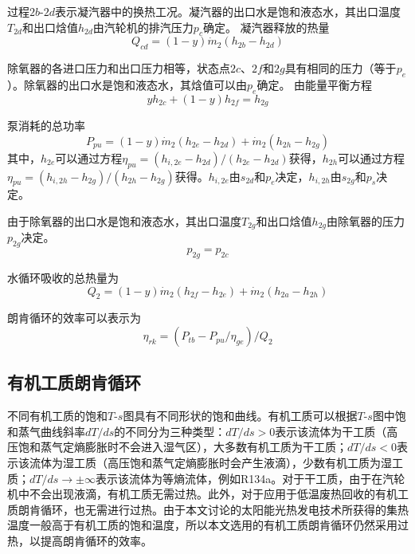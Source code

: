   过程$2b$-$2d$表示凝汽器中的换热工况。凝汽器的出口水是饱和液态水，其出口温度$T_{2d}$和出口焓值$h_{2d}$由汽轮机的排汽压力$p_c$确定。
  凝汽器释放的热量
  \begin{equation}
      Q_{cd} = (1-y)\dot{m}_2 (h_{2b} - h_{2d})
\end{equation}

  除氧器的各进口压力和出口压力相等，状态点$2c$、$2f$和$2g$具有相同的压力（等于$p_e$）。除氧器的出口水是饱和液态水，其焓值可以由$p_e$确定。
  由能量平衡方程
  \begin{equation}
  y h_{2c} + (1-y) h_{2f} = h_{2g}
\end{equation}
 
  泵消耗的总功率
\begin{equation}
	P_{pu}=\left(1-y\right)\dot{m}_{2}\left(h_{2e}-h_{2d}\right)+\dot{m}_{2}\left(h_{2h}-h_{2g}\right)
\end{equation}   
其中，$h_{2e}$可以通过方程$\eta_{pu} = (h_{i,2e}-h_{2d})/(h_{2e}-h_{2d})$获得，$h_{2h}$可以通过方程$\eta_{pu} = (h_{i,2h}-h_{2g})/(h_{2h}-h_{2g})$获得。$h_{i,2e}$由$s_{2d}$和$p_e$决定，$h_{i,2h}$由$s_{2g}$和$p_s$决定。

由于除氧器的出口水是饱和液态水，其出口温度$T_{2g}$和出口焓值$h_{2g}$由除氧器的压力$p_{2g}$决定。
\begin{equation}
  p_{2g} = p_{2c}
\end{equation}
    
水循环吸收的总热量为
\begin{equation}
	Q_2=\left(1-y\right)\dot{m}_{2}\left(h_{2f}-h_{2e}\right)+\dot{m}_{2}\left(h_{2a}-h_{2h}\right)
\end{equation}

朗肯循环的效率可以表示为
\begin{equation}
	\eta_{rk}=(P_{tb}-P_{pu}/\eta_{ge})/Q_{2}
\end{equation}

\subsection{有机工质朗肯循环}
  
不同有机工质的饱和$T$-$s$图具有不同形状的饱和曲线。有机工质可以根据$T$-$s$图中饱和蒸气曲线斜率$dT/ds$的不同分为三种类型：$dT / ds > 0$表示该流体为干工质（高压饱和蒸气定熵膨胀时不会进入湿气区），大多数有机工质为干工质；$dT / ds < 0$表示该流体为湿工质（高压饱和蒸气定熵膨胀时会产生液滴），少数有机工质为湿工质；$dT/ds \rightarrow \pm\infty$表示该流体为等熵流体，例如R134a。对于干工质，由于在汽轮机中不会出现液滴，有机工质无需过热。此外，对于应用于低温废热回收的有机工质朗肯循环，也无需进行过热。由于本文讨论的太阳能光热发电技术所获得的集热温度一般高于有机工质的饱和温度，所以本文选用的有机工质朗肯循环仍然采用过热，以提高朗肯循环的效率。

